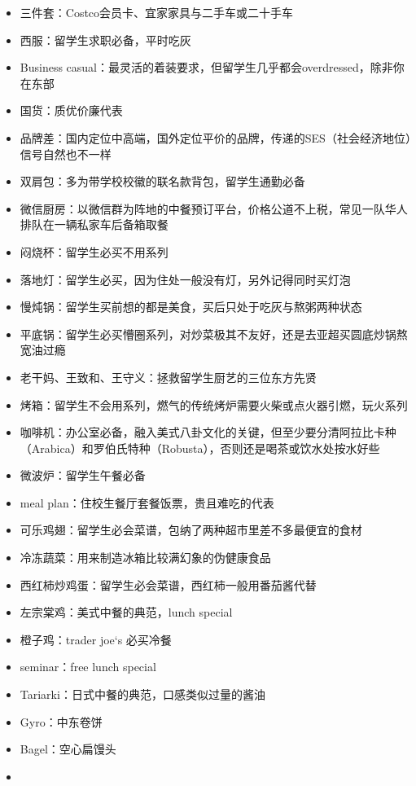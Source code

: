 \documentclass[]{tufte-book}
\providecommand{\tightlist}{%
  \setlength{\itemsep}{0pt}\setlength{\parskip}{0pt}}
\begin{document}
\begin{itemize}
\tightlist
\item
  三件套：Costco会员卡、宜家家具与二手车或二十手车
\item
  西服：留学生求职必备，平时吃灰
\item
  Business casual：最灵活的着装要求，但留学生几乎都会overdressed，除非你在东部
\item
  国货：质优价廉代表
\item
  品牌差：国内定位中高端，国外定位平价的品牌，传递的SES（社会经济地位）信号自然也不一样
\item
  双肩包：多为带学校校徽的联名款背包，留学生通勤必备
\item
  微信厨房：以微信群为阵地的中餐预订平台，价格公道不上税，常见一队华人排队在一辆私家车后备箱取餐
\item
  闷烧杯：留学生必买不用系列
\item
  落地灯：留学生必买，因为住处一般没有灯，另外记得同时买灯泡
\item
  慢炖锅：留学生买前想的都是美食，买后只处于吃灰与熬粥两种状态
\item
  平底锅：留学生必买懵圈系列，对炒菜极其不友好，还是去亚超买圆底炒锅熬宽油过瘾
\item
  老干妈、王致和、王守义：拯救留学生厨艺的三位东方先贤
\item
  烤箱：留学生不会用系列，燃气的传统烤炉需要火柴或点火器引燃，玩火系列
\item
  咖啡机：办公室必备，融入美式八卦文化的关键，但至少要分清阿拉比卡种（Arabica）和罗伯氏特种（Robusta），否则还是喝茶或饮水处按水好些
\item
  微波炉：留学生午餐必备
\item
  meal plan：住校生餐厅套餐饭票，贵且难吃的代表
\item
  可乐鸡翅：留学生必会菜谱，包纳了两种超市里差不多最便宜的食材
\item
  冷冻蔬菜：用来制造冰箱比较满幻象的伪健康食品
\item
  西红柿炒鸡蛋：留学生必会菜谱，西红柿一般用番茄酱代替
\item
  左宗棠鸡：美式中餐的典范，lunch special
\item
  橙子鸡：trader joe`s 必买冷餐
\item
  seminar：free lunch special
\item
  Tariarki：日式中餐的典范，口感类似过量的酱油
\item
  Gyro：中东卷饼
\item
  Bagel：空心扁馒头
\item

\end{itemize}
\end{document}
